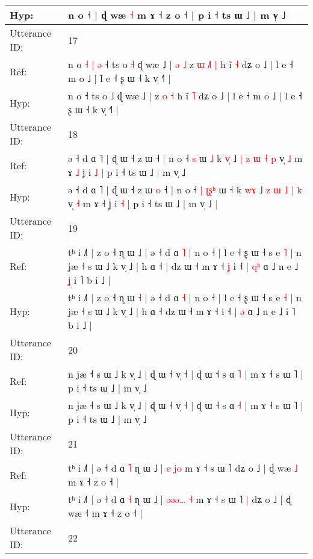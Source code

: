 \documentclass[10pt]{article}
\DeclareRobustCommand{\hl}[1]{{\textcolor{red}{#1}}}
\begin{document}
\begin{longtable}{ll}
 \\
Hyp: & n o ˧ | ɖ wæ \hl{˧} m ɤ ˧ z o ˧ | p i ˧ ts ɯ ˩ | m v̩ ˩
 \\
\midrule
Utterance ID: & 17 \\
Ref: & n o\hl{ }\hl{˧}\hl{ }\hl{|}\hl{ }\hl{ə} ˧ ts o \hl{˧} ɖ wæ ˩ |\hl{ }\hl{ə}\hl{ }\hl{˩} z\hl{ }\hl{ɯ} \hl{˩}\hl{˥} \hl{|} h ĩ \hl{˧} dʑ o ˩ | l e ˧ m o ˩ | l e ˧ ʂ ɯ ˧ k v̩ ˧˥ |
 \\
Hyp: & n o\hl{}\hl{}\hl{}\hl{}\hl{}\hl{} ˧ ts o \hl{˩} ɖ wæ ˩ |\hl{}\hl{}\hl{}\hl{} z\hl{}\hl{} \hl{}\hl{o} \hl{˧} h ĩ \hl{˥} dʑ o ˩ | l e ˧ m o ˩ | l e ˧ ʂ ɯ ˧ k v̩ ˧˥ |
 \\
\midrule
Utterance ID: & 18 \\
Ref: & ə ˧ d ɑ ˥ | ɖ ɯ ˧ z ɯ\hl{}\hl{} ˧ | n o ˧\hl{}\hl{} \hl{}\hl{}\hl{s} ɯ \hl{˩} k \hl{v}\hl{̩} ˩ \hl{|} \hl{z} \hl{ɯ} \hl{˧} \hl{p} v̩ \hl{˩} m ɤ \hl{˩} ʝ i \hl{˩} | p i ˧ ts ɯ ˩ | m v̩ ˩\hl{}\hl{}
 \\
Hyp: & ə ˧ d ɑ ˥ | ɖ ɯ ˧ z ɯ\hl{ }\hl{o} ˧ | n o ˧\hl{ }\hl{|} \hl{ʈ}\hl{ʂ}\hl{ʰ} ɯ \hl{˧} k \hl{w}\hl{ɤ} ˩ \hl{z} \hl{ɯ} \hl{˩} \hl{|} \hl{k} v̩ \hl{˧} m ɤ \hl{˧} ʝ i \hl{˧} | p i ˧ ts ɯ ˩ | m v̩ ˩\hl{ }\hl{|}
 \\
\midrule
Utterance ID: & 19 \\
Ref: & tʰ i ˩˥ | z o ˧ ɳ ɯ \hl{˩} | ə ˧ d ɑ \hl{˥} | n o ˧ | l e ˧ ʂ ɯ ˧ s e \hl{˥} | n jæ ˧ s ɯ ˩ k v̩ ˩ | h ɑ ˧\hl{ }\hl{|} dz ɯ ˧ m ɤ ˧\hl{ }\hl{ʝ} i ˧ | \hl{q}\hl{ʰ} ɑ ˩ n e ˩\hl{ }\hl{ʝ} i ˥ b i ˩ |
 \\
Hyp: & tʰ i ˩˥ | z o ˧ ɳ ɯ \hl{˧} | ə ˧ d ɑ \hl{˧} | n o ˧ | l e ˧ ʂ ɯ ˧ s e \hl{˧} | n jæ ˧ s ɯ ˩ k v̩ ˩ | h ɑ ˧\hl{}\hl{} dz ɯ ˧ m ɤ ˧\hl{}\hl{} i ˧ | \hl{}\hl{ə} ɑ ˩ n e ˩\hl{}\hl{} i ˥ b i ˩ |
 \\
\midrule
Utterance ID: & 20 \\
Ref: & n jæ ˧ s ɯ ˩ k v̩ ˩ | ɖ ɯ ˧ v̩ ˧ | ɖ ɯ ˧ s ɑ \hl{˥} | m ɤ ˧ s ɯ ˥ | p i ˧ ts ɯ ˩ | m v̩ ˩
 \\
Hyp: & n jæ ˧ s ɯ ˩ k v̩ ˩ | ɖ ɯ ˧ v̩ ˧ | ɖ ɯ ˧ s ɑ \hl{˧} | m ɤ ˧ s ɯ ˥ | p i ˧ ts ɯ ˩ | m v̩ ˩
 \\
\midrule
Utterance ID: & 21 \\
Ref: & tʰ i ˩˥ | ə ˧ d ɑ \hl{˥} ɳ ɯ ˩ | \hl{}\hl{}\hl{e}\hl{ }\hl{j}\hl{o} m ɤ ˧ s ɯ ˥\hl{}\hl{} dʑ o ˩ | ɖ wæ \hl{˩} m ɤ ˧ z o ˧ |
 \\
Hyp: & tʰ i ˩˥ | ə ˧ d ɑ \hl{˧} ɳ ɯ ˩ | \hl{ə}\hl{ə}\hl{ə}\hl{…}\hl{ }\hl{˧} m ɤ ˧ s ɯ ˥\hl{ }\hl{|} dʑ o ˩ | ɖ wæ \hl{˧} m ɤ ˧ z o ˧ |
 \\
\midrule
Utterance ID: & 22 \\

\end{longtable}
\end{document}
